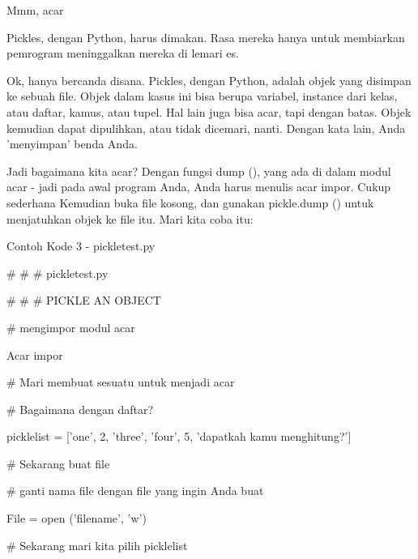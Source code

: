 \noindent 
Mmm, acar \par
\noindent 
\vspace{12pt}
\noindent 
Pickles, dengan Python, harus dimakan. Rasa mereka hanya untuk membiarkan pemrogram meninggalkan mereka di lemari es. \par
\noindent 
\vspace{12pt}
\noindent 
Ok, hanya bercanda disana. Pickles, dengan Python, adalah objek yang disimpan ke sebuah file. Objek dalam kasus ini bisa berupa variabel, instance dari kelas, atau daftar, kamus, atau tupel. Hal lain juga bisa acar, tapi dengan batas. Objek kemudian dapat dipulihkan, atau tidak dicemari, nanti. Dengan kata lain, Anda 'menyimpan' benda Anda. \par
\noindent 
\vspace{12pt}
\noindent 
Jadi bagaimana kita acar? Dengan fungsi dump (), yang ada di dalam modul acar - jadi pada awal program Anda, Anda harus menulis acar impor. Cukup sederhana Kemudian buka file kosong, dan gunakan pickle.dump () untuk menjatuhkan objek ke file itu. Mari kita coba itu: \par
\noindent 
Contoh Kode 3 - pickletest.py \par
\noindent 
\vspace{12pt}
\noindent 
 $  \#  $ $  \#  $ $  \#  $ pickletest.py \par
\noindent 
 $  \#  $ $  \#  $ $  \#  $ PICKLE AN OBJECT \par
\noindent 
\vspace{12pt}
\noindent 
 $  \#  $ mengimpor modul acar \par
\noindent 
Acar impor \par
\noindent 
\vspace{12pt}
\noindent 
 $  \#  $ Mari membuat sesuatu untuk menjadi acar \par
\noindent 
 $  \#  $ Bagaimana dengan daftar? \par
\noindent 
picklelist = ['one', 2, 'three', 'four', 5, 'dapatkah kamu menghitung?'] \par
\noindent 
\vspace{12pt}
\noindent 
 $  \#  $ Sekarang buat file \par
\noindent 
 $  \#  $ ganti nama file dengan file yang ingin Anda buat \par
\noindent 
File = open ('filename', 'w') \par
\noindent 
\vspace{12pt}
\noindent 
 $  \#  $ Sekarang mari kita pilih picklelist \par
